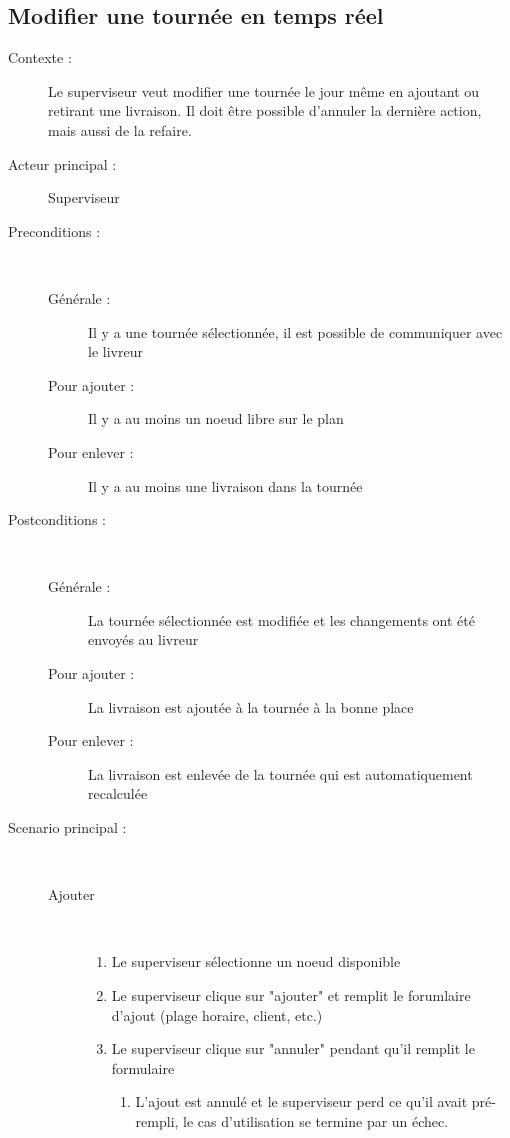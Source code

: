 \subsection{Modifier une tourn\'ee en temps r\'eel}
\begin{description}
    \item[Contexte :] Le superviseur veut modifier une tourn\'ee le jour m\^eme en ajoutant ou retirant une livraison. Il doit \^etre possible d'annuler la derni\`ere action, mais aussi de la refaire.
    \item[Acteur principal :] Superviseur
    \item[Preconditions :] ~
    \begin{description}
        \item[G\'en\'erale :] Il y a une tourn\'ee s\'electionn\'ee, il est possible de communiquer avec le livreur
        \item[Pour ajouter :] Il y a au moins un noeud libre sur le plan
        \item[Pour enlever :] Il y a au moins une livraison dans la tourn\'ee
    \end{description}
    \item[Postconditions :] ~
    \begin{description}
        \item[G\'en\'erale :] La tourn\'ee s\'electionn\'ee est modifi\'ee et les changements ont \'et\'e envoy\'es au livreur
        \item[Pour ajouter :] La livraison est ajout\'ee \`a la tourn\'ee \`a la bonne place
        \item[Pour enlever :] La livraison est enlev\'ee de la tourn\'ee qui est automatiquement recalcul\'ee
    \end{description}
    \item[Scenario principal :] ~
    \begin{description}
        \item[Ajouter] ~
        \begin{enumerate}
            \item Le superviseur s\'electionne un noeud disponible
            \item Le superviseur clique sur "ajouter" et remplit le forumlaire d'ajout (plage horaire, client, etc.)
            \item Le superviseur clique sur "annuler" pendant qu'il remplit le formulaire
            \begin{enumerate}
                \item L'ajout est annul\'e et le superviseur perd ce qu'il avait pr\'e-rempli, le cas d'utilisation se termine par un \'echec.

\end{enumerate}
\end{enumerate}
\end{description}
\end{description}
